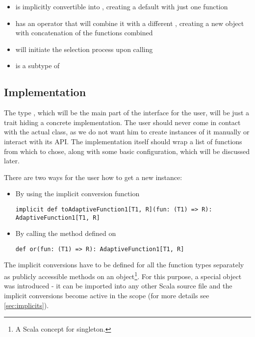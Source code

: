 \begin{itemize}
	\item {} is implicitly convertible into , creating a default with just one function
	\item {} has an operator  that will combine it with a different , creating a new object with concatenation of the functions combined
	\item {} will initiate the selection process upon calling 
	\item {} is a subtype of 
\end{itemize}

\subsection{Implementation}
\label{subsec:api_implementation}

The type , which will be the main part of the interface for the user, will be just a trait hiding a concrete implementation. The user should never come in contact with the actual class, as we do not want him to create instances of it manually or interact with its API. The implementation itself should wrap a list of functions from which to chose, along with some basic configuration, which will be discussed later.

There are two ways for the user how to get a new  instance:

\begin{itemize}
	\item By using the implicit conversion function
	\lstset{style=Scala}
	\begin{lstlisting}
implicit def toAdaptiveFunction1[T1, R](fun: (T1) => R): AdaptiveFunction1[T1, R]
\end{lstlisting}
	\item By calling the  method defined on 
		\lstset{style=Scala}
	\begin{lstlisting}
def or(fun: (T1) => R): AdaptiveFunction1[T1, R]
	\end{lstlisting}
\end{itemize}

The implicit conversions have to be defined for all the function types separately as publicly accessible methods on an object\footnote{A Scala concept for singleton.}. For this purpose, a special object  was introduced - it can be imported into any other Scala source file and the implicit conversions become active in the scope (for more details see \ref{sec:implicits}).

